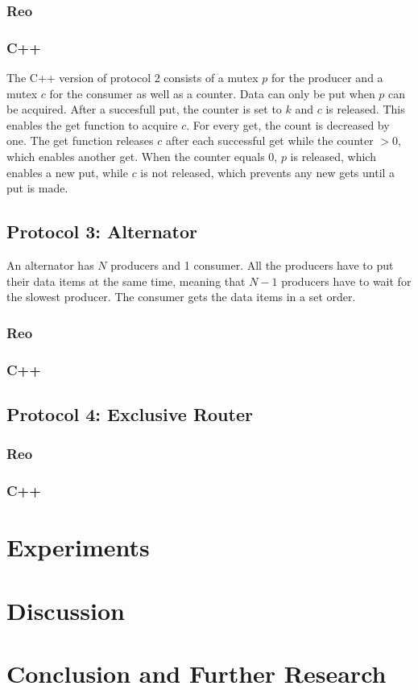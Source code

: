 \documentclass{article}
\begin{document}
\subsubsection{Reo}

\subsubsection{C++} %
The C++ version of protocol 2 consists of a mutex $p$ for the producer and a mutex $c$ for the consumer as well as a counter. Data can only be put when $p$ can be acquired. After a succesfull put, the counter is set to $k$ and $c$ is released. This enables the get function to acquire $c$. For every get, the count is decreased by one. The get function releases $c$ after each successful get while the counter $> 0$, which enables another get. When the counter equals 0, $p$ is released, which enables a new put, while $c$ is not released, which prevents any new gets until a put is made.

\subsection{Protocol 3: Alternator}
An alternator has $N$ producers and 1 consumer. All the producers have to put their data items at the same time, meaning that $N-1$ producers have to wait for the slowest producer. The consumer gets the data items in a set order.

\subsubsection{Reo}

\subsubsection{C++}


\subsection{Protocol 4: Exclusive Router}

\subsubsection{Reo}

\subsubsection{C++}

\section{Experiments}

\section{Discussion}

\section{Conclusion and Further Research}

\newpage



\end{document}
